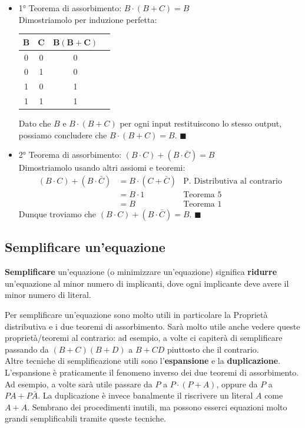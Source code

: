 \documentclass[11pt, a4paper, titlepage, oneside]{scrbook}
\begin{document}
\begin{itemize}
    \item 1° Teorema di assorbimento: $B \cdot (B + C) = B$ \\
    Dimostriamolo per induzione perfetta:
    \begin{center}
    \begin{tabular}{cc|cc}
    $\bm{B}$ & $\bm{C}$ & $\bm{B(B+C)}$ \\
    \hline
    0 & 0 & 0 \\
    0 & 1 & 0 \\
    1 & 0 & 1 \\
    1 & 1 & 1 \\
    \end{tabular}
    \end{center}
    Dato che $B$ e $B \cdot (B + C)$ per ogni input restituiscono lo stesso output, possiamo concludere che $B \cdot (B + C) = B$. $\blacksquare$ 
    \item 2° Teorema di assorbimento: $(B \cdot C) + (B \cdot \bar{C}) = B$ \\
    Dimostriamolo usando altri assiomi e teoremi:
    \begin{align*}
    (B \cdot C) + (B \cdot \bar{C}) &=  B \cdot (C + \bar{C}) &\text{P. Distributiva al contrario}\\
     &= B \cdot 1 &\text{Teorema 5} \\
     &= B &\text{Teorema 1} 
    \end{align*}
    Dunque troviamo che $(B \cdot C) + (B \cdot \bar{C}) = B$. $\blacksquare$
\end{itemize}

\subsection{Semplificare un'equazione}

\begin{Definizione}
\label{def-semplificare-equazione}
\textbf{Semplificare} un'equazione (o minimizzare un'equazione) significa \textbf{ridurre} un'equazione al minor numero di implicanti, dove ogni implicante deve avere il minor numero di literal.
\end{Definizione}

Per semplificare un'equazione sono molto utili in particolare la Proprietà distributiva e i due teoremi di assorbimento. Sarà molto utile anche vedere queste proprietà/teoremi al contrario: ad esempio, a volte ci capiterà di  semplificare passando da $(B + C) (B + D)$ a $B + CD$ piuttosto che il contrario. \\
Altre tecniche di semplificazione utili sono l'\textbf{espansione} e la \textbf{duplicazione}. L'espansione è praticamente il fenomeno inverso dei due teoremi di assorbimento. Ad esempio, a volte sarà utile passare da $P$ a $P \cdot (P + A)$, oppure da $P$ a $PA + P \bar{A}$. La duplicazione è invece banalmente il riscrivere un literal $A$ come $A + A$. Sembrano dei procedimenti inutili, ma possono esserci equazioni molto grandi semplificabili tramite queste tecniche. 
\end{document}
